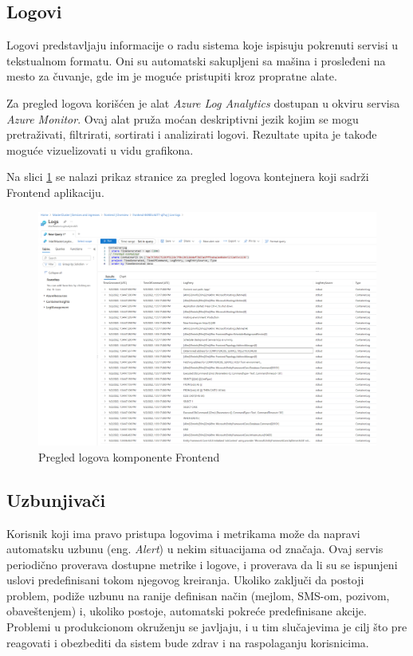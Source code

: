 \documentclass[12pt,oneside]{memoir}
\begin{document}
\subsection{Logovi}

Logovi predstavljaju informacije o radu sistema koje ispisuju pokrenuti servisi u tekstualnom formatu. Oni su automatski sakupljeni sa mašina i prosleđeni na mesto za čuvanje, gde im je moguće pristupiti kroz propratne alate.

Za pregled logova korišćen je alat \emph{Azure Log Analytics} dostupan u okviru servisa \emph{Azure Monitor}. Ovaj alat pruža moćan deskriptivni jezik kojim se mogu pretraživati, filtrirati, sortirati i analizirati logovi. Rezultate upita je takođe moguće vizuelizovati u vidu grafikona.

Na slici \ref{fig:frontendlogs} se nalazi prikaz stranice za pregled logova kontejnera koji sadrži Frontend aplikaciju.

\begin{figure}[!ht]
  \centering
  \includegraphics[width=1\textwidth]{./images/frontend_logs.png}
  \caption{Pregled logova komponente Frontend}
  \label{fig:frontendlogs}
\end{figure}


\subsection{Uzbunjivači}

Korisnik koji ima pravo pristupa logovima i metrikama može da napravi automatsku uzbunu (eng. \emph{Alert}) u nekim situacijama od značaja. Ovaj servis periodično proverava dostupne metrike i logove, i proverava da li su se ispunjeni uslovi predefinisani tokom njegovog kreiranja. Ukoliko zaključi da postoji problem, podiže uzbunu na ranije definisan način (mejlom, SMS-om, pozivom, obaveštenjem) i, ukoliko postoje, automatski pokreće predefinisane akcije. Problemi u produkcionom okruženju se javljaju, i u tim slučajevima je cilj što pre reagovati i obezbediti da sistem bude zdrav i na raspolaganju korisnicima.
\end{document}
